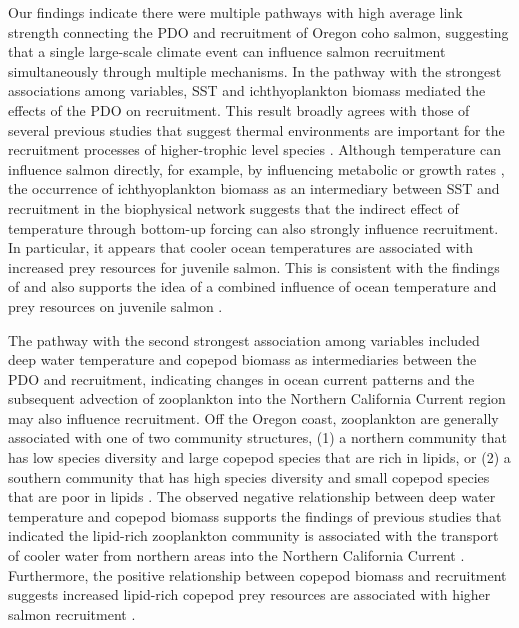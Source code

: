 Our findings indicate there were multiple pathways with high average link
strength connecting the PDO and recruitment of Oregon coho salmon, suggesting
that a single large-scale climate event can influence salmon recruitment
simultaneously through multiple mechanisms. In the pathway with the strongest
associations among variables, SST and ichthyoplankton biomass mediated the
effects of the PDO on recruitment. This result broadly agrees with those of
several previous studies that suggest thermal environments are important for the
recruitment processes of higher-trophic level species \citep{Martins2012,
Planque1999, Hunt2011a}. Although temperature can influence salmon directly, for
example, by influencing metabolic or growth rates \citep{Mortensen2000a,
Farley2007b}, the occurrence of ichthyoplankton biomass as an intermediary
between SST and recruitment in the biophysical network suggests that the
indirect effect of temperature through bottom-up forcing can also strongly
influence recruitment. In particular, it appears that cooler ocean temperatures
are associated with increased prey resources for juvenile salmon. This is
consistent with the findings of \citet{Daly2013} and also supports the idea of a
combined influence of ocean temperature and prey resources on juvenile salmon
\citep{Pearcy1992a}.

The pathway with the second strongest association among variables included deep
water temperature and copepod biomass as intermediaries between the PDO and
recruitment, indicating changes in ocean current patterns and the subsequent
advection of zooplankton into the Northern California Current region may also
influence recruitment. Off the Oregon coast, zooplankton are generally
associated with one of two community structures, (1) a northern community that
has low species diversity and large copepod species that are rich in lipids, or
(2) a southern community that has high species diversity and small copepod
species that are poor in lipids \citep{Hooff2006a}. The observed negative
relationship between deep water temperature and copepod biomass supports the
findings of previous studies that indicated the lipid-rich zooplankton community
is associated with the transport of cooler water from northern areas into the
Northern California Current \citep{Keister2011a}. Furthermore, the positive
relationship between copepod biomass and recruitment suggests increased
lipid-rich copepod prey resources are associated with higher salmon recruitment
\citep{Bi2011a}.

